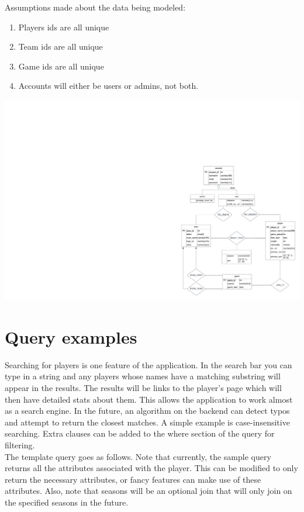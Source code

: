 \documentclass[11pt]{article}
\begin{document}
Assumptions made about the data being modeled:
\begin{enumerate}
    \item Players ids are all unique
    \item Team ids are all unique
    \item Game ids are all unique
    \item Accounts will either be users or admins, not both.
\end{enumerate}

\begin{center}
    \includegraphics[width=1\textwidth]{E_R Diagram.png}
\end{center}

\section{Query examples}


Searching for players is one feature of the application. In the search bar you can type in a string and any players whose names have a matching substring will appear in the results. The results will be links to the player's page which will then have detailed stats about them. This allows the application to work almost as a search engine. In the future, an algorithm on the backend can detect typos and attempt to return the closest matches. A simple example is case-insensitive searching. Extra clauses can be added to the where section of the query for filtering. \\

The template query goes as follows. Note that currently, the sample query returns all the attributes associated with the player. This can be modified to only return the necessary attributes, or fancy features can make use of these attributes. Also, note that seasons will be an optional join that will only join on the specified seasons in the future.
\end{document}
